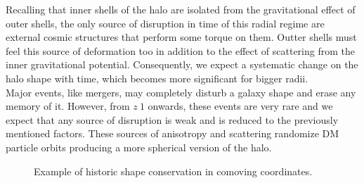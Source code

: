  Recalling that inner shells of the halo are isolated from the gravitational effect of outer shells, the only source of disruption in time of this radial regime are external cosmic structures that perform some torque on them. Outter shells must feel this source of deformation too in addition to the effect of scattering from the inner gravitational potential. Consequently, we expect a systematic change on the halo shape with time, which becomes more significant for bigger radii.\\
 
Major events, like mergers, may completely disturb a galaxy shape and erase any memory of it. However, from $z~1$ onwards, these events are very rare \cite{} and we expect that any source of disruption is weak and is reduced to the previously mentioned factors. These sources of anisotropy and scattering randomize DM particle orbits producing a more spherical version of the halo. \cite{} \\  

\begin{figure}[!ht]
  \centering
  \hfill
  \caption{Example of historic shape conservation in comoving coordinates.}
  \label{fig:RedshiftGood}
\end{figure}

